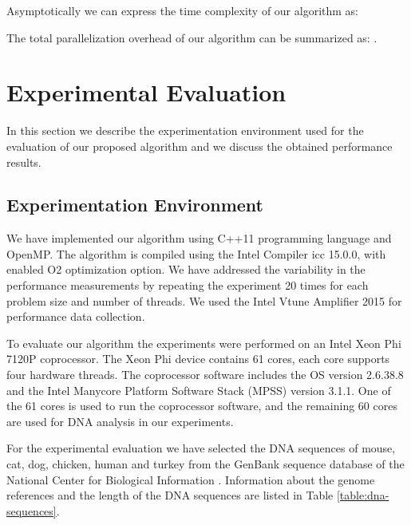 \documentclass[conference]{IEEEtran}
\begin{document}
Asymptotically we can express the time complexity of our algorithm as:



The total parallelization overhead of our algorithm can be summarized as: .





\section{Experimental Evaluation} 
\label{exp_evaluation}

In this section we describe the experimentation environment used for the evaluation of our proposed algorithm and we discuss the obtained performance results.


\subsection{Experimentation Environment}

We have implemented our algorithm using C++11 programming language and OpenMP. The algorithm is compiled using the Intel Compiler icc 15.0.0, with enabled O2 optimization option. We have addressed the variability in the performance measurements by repeating the experiment 20 times for each problem size and number of threads. We used the Intel Vtune Amplifier 2015 for performance data collection. 

To evaluate our algorithm the experiments were performed on an Intel Xeon Phi 7120P coprocessor. The Xeon Phi device contains 61 cores, each core supports four hardware threads. The coprocessor software includes the OS version 2.6.38.8 and the Intel Manycore Platform Software Stack (MPSS) version 3.1.1. One of the 61 cores is used to run the coprocessor software, and the remaining 60 cores are used for DNA analysis in our experiments. 

For the experimental evaluation we have selected the DNA sequences of mouse, cat, dog, chicken, human and turkey from the GenBank sequence database of the National Center for Biological Information \cite{GenBank}. Information about the genome references and the length of the DNA sequences are listed in Table \ref{table:dna-sequences}.
\end{document}
